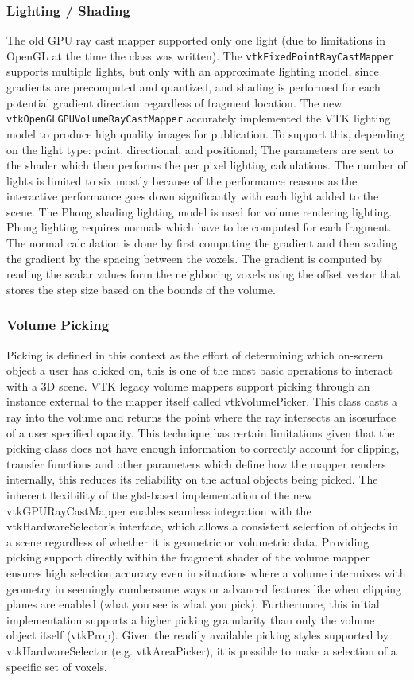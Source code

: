 \subsubsection{Lighting / Shading }
The old GPU ray cast mapper supported only one light (due to limitations in OpenGL at the time the class was written). The \texttt{vtkFixedPointRayCastMapper} supports multiple lights, but only with an approximate lighting model, since gradients are precomputed and quantized, and shading is performed for each potential gradient direction regardless of fragment location. The new \texttt{vtkOpenGLGPUVolumeRayCastMapper} accurately implemented the VTK lighting model to produce high quality images for publication. To support this, depending on the light type: point, directional, and positional; The parameters are sent to the shader which then performs the per pixel lighting calculations. The number of lights is limited to six mostly because of the performance reasons as the interactive performance goes down significantly with each light added to the scene. The Phong shading lighting model is used for volume rendering lighting. Phong lighting requires normals which have to be computed for each fragment. The normal calculation is done by first computing the gradient and then scaling the gradient by the spacing between the voxels. The gradient is computed by reading the scalar values form the neighboring voxels using the offset vector that stores the step size based on the bounds of the volume. 

\subsubsection{Volume Picking}
Picking is defined in this context as the effort of determining which on-screen object a user has clicked on,  this is one of the most basic operations to interact with a 3D scene. VTK legacy volume mappers support picking through an instance external to the mapper itself called vtkVolumePicker.  This class casts a ray into the volume and returns the point where the ray intersects an isosurface of a user specified opacity. This technique has certain limitations given that the picking class does not have enough information to correctly account for clipping, transfer functions and other parameters which define how the mapper renders internally, this reduces its reliability on the actual objects being picked.
The inherent flexibility of the glsl-based implementation of the new vtkGPURayCastMapper enables seamless integration with the vtkHardwareSelector's interface, which allows a consistent selection of objects in a scene regardless of whether it is geometric or volumetric data.  Providing picking support directly within the fragment shader of the volume mapper ensures high selection accuracy even in situations where a volume intermixes with geometry in seemingly cumbersome ways or advanced features like when clipping planes are enabled (what you see is what you pick).
Furthermore, this initial implementation supports a higher picking granularity than only the volume object itself (vtkProp).  Given the readily available picking styles supported by vtkHardwareSelector (e.g. vtkAreaPicker), it is possible to make a selection of a specific set of voxels.

